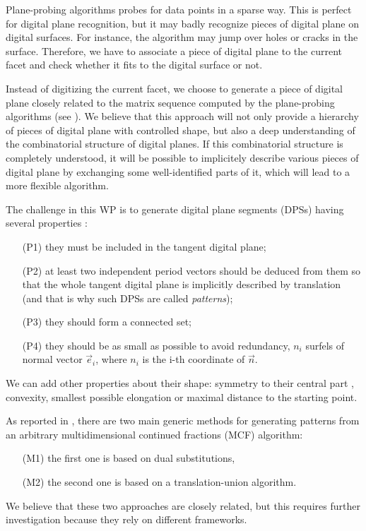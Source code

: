 Plane-probing algorithms probes for data points in a sparse way.
This is perfect for digital plane recognition, but it may badly
recognize pieces of digital plane on digital surfaces. For
instance, the algorithm may jump over holes or cracks in the
surface. Therefore, we have to associate a piece of digital plane
to the current facet and check whether it fits to the digital surface
or not.

Instead of digitizing the current facet, we choose to generate a piece
of digital plane closely related to the matrix sequence computed by
the plane-probing algorithms (see ). We believe that
this approach will not only provide a hierarchy of pieces of digital
plane with controlled shape, but also a deep understanding of the
combinatorial structure of digital planes. If this combinatorial
structure is completely understood, it will be possible to implicitely
describe various pieces of digital plane by exchanging some well-identified
parts of it, which will lead to a more flexible algorithm. 

The challenge in this WP is to generate digital plane segments (DPSs)
having several properties \cite{Jamet2016}:
\begin{enumerate}
\item[(P1)] they must be included in the tangent digital plane;
\item[(P2)] at least two independent period vectors should be deduced from them
  so that the whole tangent digital plane is implicitly described by translation
  (and that is why such DPSs are called \emph{patterns});
\item[(P3)] they should form a connected set;
\item[(P4)] they should be as small as possible to avoid redundancy,
  \eg $n_i$ surfels of normal vector $\vec{e}_i$, where $n_i$ is the i-th coordinate
  of $\vec{n}$. 
\end{enumerate}
We can add other properties about their shape: symmetry to their central part \cite{Labbe2015},
convexity, smallest possible elongation or maximal distance to the starting point.

As reported in , there are two main generic methods for generating patterns
from an arbitrary multidimensional continued fractions (MCF) algorithm:
\begin{itemize}
\item[(M1)] the first one is based on dual substitutions, 
\item[(M2)] the second one is based on a translation-union algorithm.
\end{itemize}
We believe that these two approaches are closely related, but this requires
further investigation because they rely on different frameworks. 

